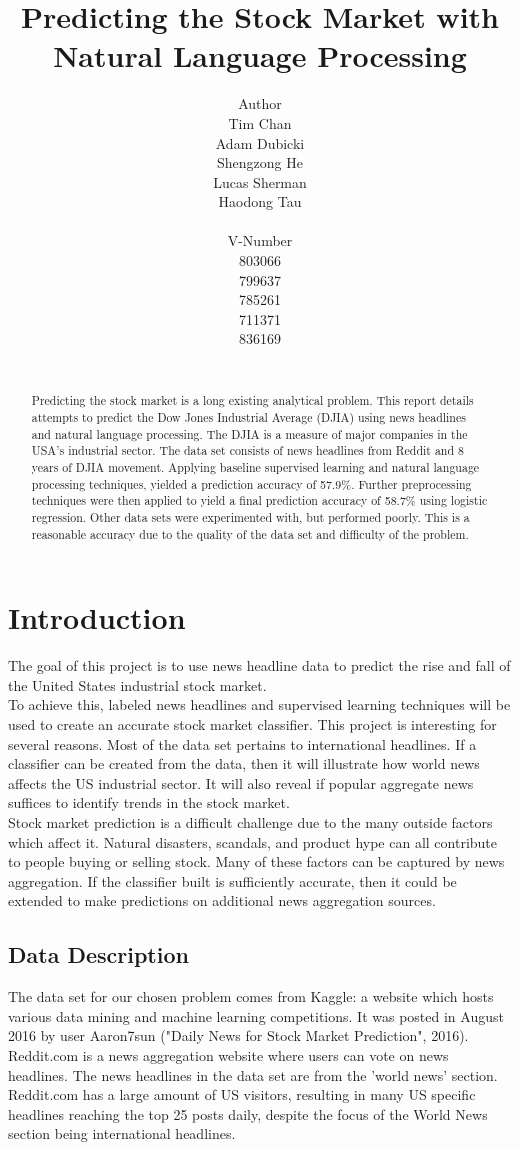 \documentclass[11pt,a4paper]{article}
\title{Predicting the Stock Market with Natural Language Processing}
\author{Author \\
  Tim Chan \\
  Adam Dubicki \\
  Shengzong He \\
  Lucas Sherman\\
  Haodong Tau\\
  {\tt} \\\And
  V-Number \\
  803066 \\
  799637 \\
  785261 \\
  711371\\
  836169\\
  {\tt} \\}
\date{}
\begin{document}
\maketitle

\begin{abstract}
	Predicting the stock market is a long existing analytical problem. This report details attempts to predict the Dow Jones Industrial Average (DJIA) using news headlines and natural language processing. The DJIA is a measure of major companies in the USA's industrial sector. The data set consists of news headlines from Reddit and 8 years of DJIA movement. Applying baseline supervised learning and natural language processing techniques, yielded a prediction accuracy of 57.9\%. Further preprocessing techniques were then applied to yield a final prediction accuracy of 58.7\% using logistic regression. Other data sets were experimented with, but performed poorly. This is a reasonable accuracy due to the quality of the data set and difficulty of the problem.
\end{abstract}

\section{Introduction}
The goal of this project is to use news headline data to predict the rise and fall of the United States industrial stock market.\\

To achieve this, labeled news headlines and supervised learning techniques will be used to create an accurate stock market classifier. This project is interesting for several reasons. Most of the data set pertains to international headlines. If a classifier can be created from the data, then it will illustrate how world news  affects the US industrial sector. It will also reveal if popular aggregate news suffices to identify trends in the stock market.\\

Stock market prediction is a difficult challenge due to the many outside factors which affect it. Natural disasters, scandals, and product hype can all contribute to people buying or selling stock. Many of these factors can be captured by news aggregation. If the classifier built is sufficiently accurate, then it could be extended to make predictions on additional news aggregation sources.\\

\subsection{Data Description}
The data set for our chosen problem comes from Kaggle: a website which hosts various data mining and machine learning competitions. It was posted in August 2016 by user Aaron7sun ("Daily News for Stock Market Prediction", 2016). Reddit.com is a news aggregation website where users can vote on news headlines. The news headlines in the data set are from the 'world news' section. Reddit.com has a large amount of US visitors, resulting in many US specific headlines reaching the top 25 posts daily, despite the focus of the World News section being international headlines.\\
\end{document}
